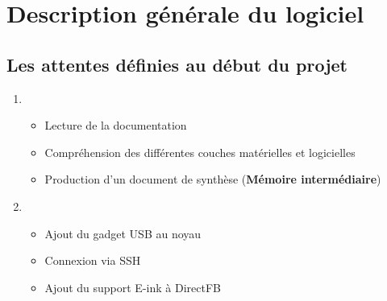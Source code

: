 \section[Description]{Description générale du logiciel}
\subsection[Objectifs]{Les attentes définies au début du projet}
\begin{frame}
\begin{enumerate}
\item
{
\begin{itemize}
\item{Lecture de la documentation}
\item{Compréhension des différentes couches matérielles et logicielles}
\item{Production d'un document de synthèse (\textbf{Mémoire intermédiaire})}
\end{itemize}
}
\item
{
\begin{itemize}
\item{Ajout du gadget USB au noyau}
\item{Connexion via SSH}
\item{Ajout du support E-ink à DirectFB}
\end{itemize}
}
\end{enumerate}
\end{frame}